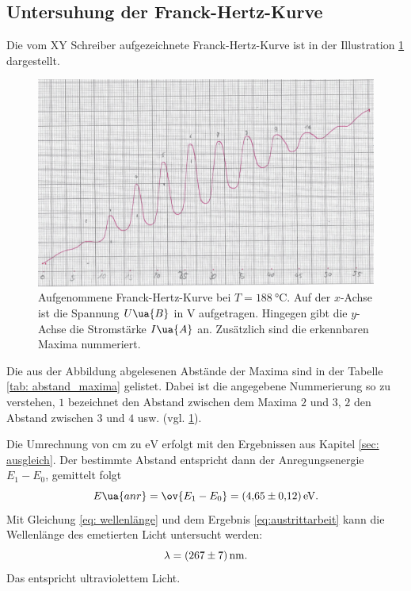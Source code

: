 \subsection{Untersuhung der Franck-Hertz-Kurve}\label{sec: frank} %
\FloatBarrier
Die vom XY Schreiber aufgezeichnete Franck-Hertz-Kurve ist in der Illustration \ref{fig: messkurve_frank_hertz} dargestellt. %
\begin{figure}
  \centering
  \includegraphics[width=0.8 \textwidth]{./pics/frank_hertz_kurve.png}
  \caption{Aufgenommene Franck-Hertz-Kurve bei $T=\SI{188}{\celsius}$. Auf der $x$-Achse ist die Spannung $U\ua{B}$ in $\si{\volt}$ aufgetragen.
          Hingegen gibt die $y$-Achse die Stromstärke $I\ua{A}$ an. Zusätzlich sind die erkennbaren Maxima nummeriert.}
  \label{fig: messkurve_frank_hertz}
\end{figure}
Die aus der Abbildung abgelesenen Abstände der Maxima sind in der Tabelle \ref{tab: abstand_maxima} gelistet.
Dabei ist die angegebene Nummerierung so zu verstehen, $1$ bezeichnet den Abstand zwischen dem Maxima $2$ und $3$, $2$ den Abstand zwischen $3$ und $4$ usw. (vgl. \ref{fig: messkurve_frank_hertz}). %

Die Umrechnung von $\si{\centi\meter}$ zu $\si{\eV}$ erfolgt mit den Ergebnissen aus Kapitel \ref{sec: ausgleich}.
Der bestimmte Abstand entspricht dann der Anregungsenergie $E_1-E_0$, gemittelt folgt
\begin{equation}
  \label{eq:austrittarbeit}
E\ua{anr}=\ov{E_1-E_0}=\SI{4.65\pm0.12}{\eV}.
\end{equation}
Mit Gleichung \eqref{eq: wellenlänge} und dem Ergebnis \eqref{eq:austrittarbeit} kann die Wellenlänge des emetierten Licht untersucht werden: %
\begin{equation}
  \label{eq: lambda}
  \lambda=\SI{267\pm7}{\nano\meter}.
\end{equation}
Das entspricht ultraviolettem Licht.

